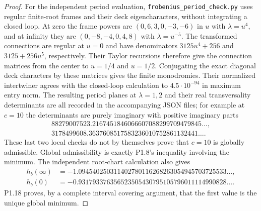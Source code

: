 \begin{proof}
For the independent period evaluation,
\texttt{frobenius\_period\_check.py} uses regular finite-root frames
and their deck eigencharacters, without integrating a closed loop.
At zero the frame powers are $(0,6,3,0,-3,-6)$ in $u$ with
$\lambda=u^4$, and at infinity they are
$(0,-8,-4,0,4,8)$ with $\lambda=u^{-5}$.
The transformed connections are regular at $u=0$ and have denominators
$3125u^4+256$ and $3125+256u^5$, respectively.
Their Taylor recursions therefore give the connection matrices from
the center to $u=1/4$ and $u=1/2$.  Conjugating the exact diagonal
deck characters by these matrices gives the finite monodromies.
Their normalized intertwiner agrees with the closed-loop calculation
to $4.5\cdot10^{-94}$ in maximum entry norm.
The resulting period planes at $\lambda=1,2$ and their real
transversality determinants are all recorded in the accompanying
JSON files; for example at $c=10$ the determinants are purely imaginary
with positive imaginary parts
\[
\begin{gathered}
88279007523.2167451846066607088299709479845\ldots,\\
3178499608.3637608517583236010752861132441\ldots.
\end{gathered}
\]
These last two local checks do not by themselves prove that $c=10$
is globally admissible.  Global admissibility is exactly P1.8's
inequality involving the minimum.  The independent root-chart
calculation also gives
\[
\begin{split}
h_b(\infty)&=-1.094540250311402780116268263054945703725533\ldots,\\
h_b(0)&=-0.931793376356523505430795105796011114990828\ldots.
\end{split}
\]
P1.18 proves, by a complete interval covering argument, that the
first value is the unique global minimum.
\end{proof}

